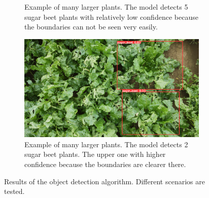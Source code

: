 \begin{figure}[htb!]
\begin{subfigure}{.6\textwidth}
		\caption{Example of many larger plants. The model detects 5 sugar beet plants with relatively low confidence because the boundaries can not be seen very easily.}
		\label{fig:result_4}
	\end{subfigure}
	\begin{subfigure}{1\textwidth}
		\centering
		\includegraphics[scale=0.115]{figures/result_5.png}
		\caption{Example of many larger plants. The model detects 2 sugar beet plants. The upper one with higher confidence because the boundaries are clearer there.}
		\label{fig:result_5}
	\end{subfigure}
	\caption{Results of the object detection algorithm. Different scenarios are tested.}
	\label{fig:final_results}
\end{figure}
